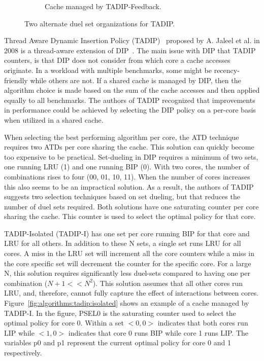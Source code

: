 \begin{figure}[H]
\begin{subfigure}[b]{0.5\textwidth}
        \caption{Cache managed by TADIP-Feedback.}
        \label{fig:algorithms:tadip:feedback}
    \end{subfigure}    
    \caption{Two alternate duel set organizations for TADIP.}
    \label{fig:algorithms:tadip}
\end{figure}

Thread Aware Dynamic Insertion Policy (TADIP)~\cite{Jaleel2008} proposed by A. Jaleel et al. in 2008 is a thread-aware extension of DIP~\cite{Qureshi2007}.
The main issue with DIP that TADIP counters, is that DIP does not consider from which core a cache accesses originate.
In a workload with multiple benchmarks, some might be recency-friendly while others are not. 
If a shared cache is managed by DIP, then the algorithm choice is made based on the sum of the cache accesses and then applied equally to all benchmarks.
The authors of TADIP recognized that improvements in performance could be achieved by selecting the DIP policy on a per-core basis when utilized in a shared cache.

When selecting the best performing algorithm per core, the ATD technique requires two ATDs per core sharing the cache. 
This solution can quickly become too expensive to be practical.
Set-dueling in DIP requires a minimum of two sets, one running LRU (1) and one running BIP (0). 
With two cores, the number of combinations rises to four (00, 01, 10, 11).
When the number of cores increases this also seems to be an impractical solution.
As a result, the authors of TADIP suggests two selection techniques based on set dueling, but that reduces the number of duel sets required.
Both solutions have one saturating counter per core sharing the cache.
This counter is used to select the optimal policy for that core.

TADIP-Isolated (TADIP-I) has one set per core running BIP for that core and LRU for all others.
In addition to these N sets, a single set runs LRU for all cores. 
A miss in the LRU set will increment all the core counters while a miss in the core specific set will decrement the counter for the specific core.
For a large N, this solution requires significantly less duel-sets compared to having one per combination ($N+1 << N^2$). 
This solution assumes that all other cores run LRU, and, therefore, cannot fully capture the effect of interactions between cores.
Figure~\ref{fig:algorithms:tadip:isolated} shows an example of a cache managed by TADIP-I. 
In the figure, PSEL0 is the saturating counter used to select the optimal policy for core 0.
Within a set $<0, 0>$ indicates that both cores run LIP while $<1, 0>$ indicates that core 0 runs BIP while core 1 runs LIP.
The variables p0 and p1 represent the current optimal policy for core 0 and 1 respectively.

